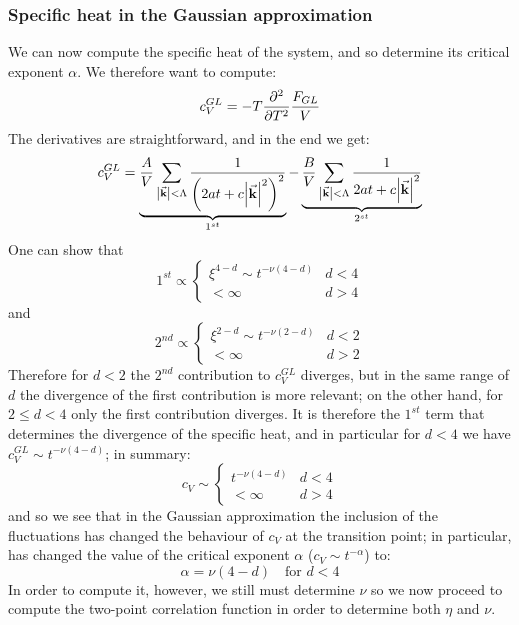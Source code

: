 \documentclass[../main/main.tex]{subfiles}
\begin{document}
\subsubsection{Specific heat in the Gaussian approximation}
We can now compute the specific heat of the system, and so determine its critical exponent \( \alpha  \). We therefore want to compute:
\begin{equation*}
    c_V^{GL} = - T \pdv[2]{}{T} \frac{F_{GL}}{V}
\end{equation*}
The derivatives are straightforward, and in the end we get:
\begin{equation*}
  c_V^{GL} =   \underbrace{\frac{A}{V} \sum_{\abs{\va{k}} < \Lambda  }^{}
  \frac{1}{ \qty(2 a t + c \abs{\va{k}}^2 )^2}}_{1^{st}}
    - \underbrace{ \frac{B}{V} \sum_{\abs{\va{k}}< \Lambda  }^{} \frac{1}{2 a t + c \abs{\va{k}}^2 }}_{2^{st}}
\end{equation*}
One can show that
\begin{equation*}
1^{st} \propto
  \begin{cases}
   \xi ^{4-d} \sim t^{-\nu (4-d)}  & d < 4\\
  < \infty & d > 4
  \end{cases}
\end{equation*}
and
\begin{equation*}
2^{nd} \propto
  \begin{cases}
   \xi ^{2-d} \sim t^{-\nu (2-d)}  & d < 2\\
  < \infty & d > 2
  \end{cases}
\end{equation*}
Therefore for \( d<2 \) the \( 2^{nd} \)  contribution to \( c_V^{GL} \) diverges, but in the same range of \( d \) the divergence of the first contribution is more relevant; on the other hand, for \( 2 \leq d < 4  \) only the first contribution diverges. It is therefore the \( 1^{st} \) term that determines the divergence of the specific heat, and in particular for \( d<4 \) we have \( c_V^{GL}  \sim t^{-\nu (4-d)} \); in summary:
\begin{equation}
  c_V \sim \begin{cases}
    t^{-\nu (4-d)} & d < 4 \\
    <\infty & d > 4
\end{cases}
\end{equation}
and so we see that in the Gaussian approximation the inclusion of the fluctuations
has changed the behaviour of \( c_V \) at the transition point; in particular, has changed the value of the critical exponent \( \alpha  \) (\( c_V \sim t^{- \alpha } \)) to:
\begin{equation}
  \alpha = \nu (4-d) \quad \text{for } d < 4
\end{equation}
In order to compute it, however, we still must determine \( \nu  \)  so we now proceed to compute the two-point correlation function in order to determine both \( \eta  \) and \( \nu  \).
\end{document}

